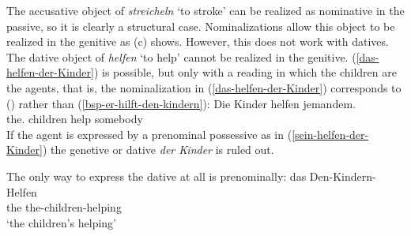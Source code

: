 \label{das-helfen-der-Kinder}
\label{sein-helfen-der-Kinder}
\zl
The accusative object of \emph{streicheln} `to stroke' can be realized as nominative in the passive,
so it is clearly a structural case. Nominalizations allow this object to be realized in the genitive
as (c) shows. However, this does not work with datives. The dative object of \emph{helfen}
`to help' cannot be realized in the genitive. (\ref{das-helfen-der-Kinder}) is possible, but only
with a reading in which the children are the agents, that is, the nominalization in
(\ref{das-helfen-der-Kinder}) corresponds to () rather than (\ref{bsp-er-hilft-den-kindern}):
\ea
\gll Die Kinder helfen jemandem.\\
     the.\NOM{} children help somebody\\
\z
If the agent is expressed by a prenominal possessive as in (\ref{sein-helfen-der-Kinder}) the
genetive or dative \emph{der Kinder} is ruled out.

The only way to express the dative at all is prenominally:
\ea
\gll das Den-Kindern-Helfen\\
     the the-children-helping\\
\glt `the children's helping'
\z

